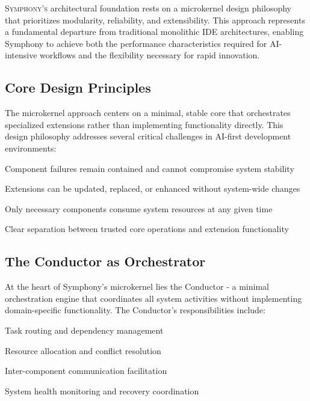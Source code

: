 
\lettrine{S}{ymphony's} architectural foundation rests on a microkernel design philosophy that prioritizes modularity, reliability, and extensibility. This approach represents a fundamental departure from traditional monolithic IDE architectures, enabling Symphony to achieve both the performance characteristics required for AI-intensive workflows and the flexibility necessary for rapid innovation.

\subsection*{Core Design Principles}

The microkernel approach centers on a \textcolor{brandPrimary}{minimal, stable core} that orchestrates specialized extensions rather than implementing functionality directly. This design philosophy addresses several critical challenges in AI-first development environments:

\begin{description}[leftmargin=4cm,labelwidth=3.5cm]
    \item[\textbf{Fault Isolation}] Component failures remain contained and cannot compromise system stability
    \item[\textbf{Independent Evolution}] Extensions can be updated, replaced, or enhanced without system-wide changes
    \item[\textbf{Resource Optimization}] Only necessary components consume system resources at any given time
    \item[\textbf{Security Boundaries}] Clear separation between trusted core operations and extension functionality
\end{description}

\subsection*{The Conductor as Orchestrator}

At the heart of Symphony's microkernel lies the \textcolor{brandSecondary}{Conductor} - a minimal orchestration engine that coordinates all system activities without implementing domain-specific functionality. The Conductor's responsibilities include:

\begin{compactlist}
    \item Task routing and dependency management
    \item Resource allocation and conflict resolution
    \item Inter-component communication facilitation
    \item System health monitoring and recovery coordination
\end{compactlist}

